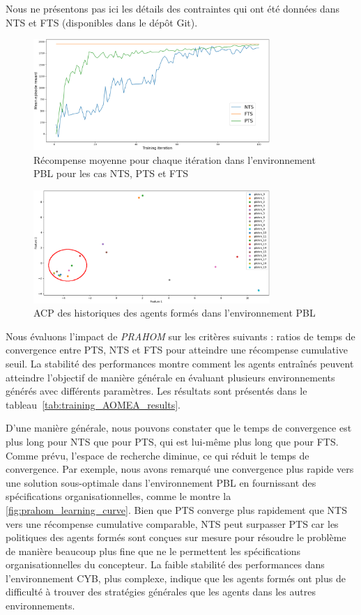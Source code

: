 \noindent Nous ne présentons pas ici les détails des contraintes qui ont été données dans NTS et FTS (disponibles dans le dépôt Git\footnotemark[1]).
%
\begin{figure}[h!]
  \centering
  \includegraphics[width=0.8\textwidth]{figures/prahom_learning_curve.png}
  \caption{Récompense moyenne pour chaque itération dans l'environnement PBL pour les cas NTS, PTS et FTS}
  \label{fig:prahom_learning_curve}
\end{figure}
%
\begin{figure}[h!]
  \centering
  \includegraphics[width=0.8\textwidth]{figures/prahom_pca_analysis.png}
  \caption{ACP des historiques des agents formés dans l'environnement PBL}
  \label{fig:prahom_pca_analysis}
\end{figure}
%
Nous évaluons l'impact de \emph{PRAHOM} sur les critères suivants : ratios de temps de convergence entre PTS, NTS et FTS pour atteindre une récompense cumulative seuil. La stabilité des performances montre comment les agents entraînés peuvent atteindre l'objectif de manière générale en évaluant plusieurs environnements générés avec différents paramètres. Les résultats sont présentés dans le tableau~\ref{tab:training_AOMEA_results}.
%

%
D'une manière générale, nous pouvons constater que le temps de convergence est plus long pour NTS que pour PTS, qui est lui-même plus long que pour FTS. Comme prévu, l'espace de recherche diminue, ce qui réduit le temps de convergence. Par exemple, nous avons remarqué une convergence plus rapide vers une solution sous-optimale dans l'environnement PBL en fournissant des spécifications organisationnelles, comme le montre la \autoref{fig:prahom_learning_curve}. Bien que PTS converge plus rapidement que NTS vers une récompense cumulative comparable, NTS peut surpasser PTS car les politiques des agents formés sont conçues sur mesure pour résoudre le problème de manière beaucoup plus fine que ne le permettent les spécifications organisationnelles du concepteur. La faible stabilité des performances dans l'environnement CYB, plus complexe, indique que les agents formés ont plus de difficulté à trouver des stratégies générales que les agents dans les autres environnements.

